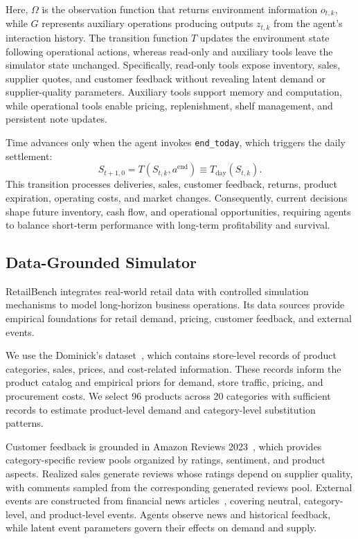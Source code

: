 Here, $\Omega$ is the observation function that returns
environment information $o_{t,k}$, while $G$ represents
auxiliary operations producing outputs $z_{t,k}$ from
the agent's interaction history.
The transition function $T$ updates the environment state
following operational actions, whereas read-only and
auxiliary tools leave the simulator state unchanged.
Specifically, read-only tools expose inventory, sales,
supplier quotes, and customer feedback without revealing
latent demand or supplier-quality parameters.
Auxiliary tools support memory and computation, while
operational tools enable pricing, replenishment,
shelf management, and persistent note updates.

Time advances only when the agent invokes \texttt{end\_today},
which triggers the daily settlement:
\begin{equation}
\label{eq:end_today_transition}
S_{t+1,0}
= T(S_{t,k},a^{\mathrm{end}})
\equiv T_{\mathrm{day}}(S_{t,k}).
\end{equation}
This transition processes deliveries, sales, customer feedback,
returns, product expiration, operating costs, and market changes.
Consequently, current decisions shape future inventory, cash flow,
and operational opportunities, requiring agents to balance
short-term performance with long-term profitability and survival.

\subsection{Data-Grounded Simulator}

RetailBench integrates real-world retail data with controlled simulation
mechanisms to model long-horizon business operations. Its data sources
provide empirical foundations for retail demand, pricing, customer
feedback, and external events.

We use the Dominick's dataset~\citep{DominicksDataset}, which contains
store-level records of product categories, sales, prices, and
cost-related information. These records inform the product catalog
and empirical priors for demand, store traffic, pricing, and
procurement costs. We select 96 products across 20 categories
with sufficient records to estimate product-level demand and
category-level substitution patterns.

Customer feedback is grounded in Amazon Reviews
2023~\citep{hou2024bridging}, which provides category-specific review
pools organized by ratings, sentiment, and product aspects.
Realized sales generate reviews whose ratings depend on supplier
quality, with comments sampled from the corresponding generated reviews pool.
External events are constructed from financial news
articles~\citep{ashraq2025financialNewsArticles}, covering neutral,
category-level, and product-level events.
Agents observe news and historical feedback, while latent event
parameters govern their effects on demand and supply.

